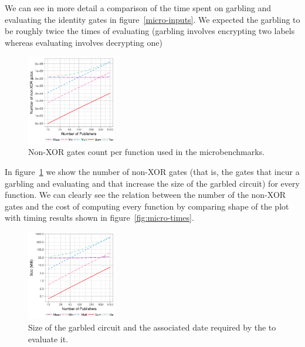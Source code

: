 We can see in more detail a comparison of the time spent on garbling and
evaluating the identity gates in figure~\ref{micro-inputs}.  We expected the
garbling to be roughly twice the times of evaluating (garbling involves
encrypting two labels whereas evaluating involves decrypting one)

\begin{figure}
  \includegraphics[width=0.35\textwidth]{plots/nonxor_gates_log.png}
  \caption{Non-XOR gates count per function used in the microbenchmarks.}
  \label{micro-nonxor}
\end{figure}

In figure~\ref{micro-nonxor} we show the number of non-XOR gates (that is, the
gates that incur a garbling and evaluating and that increase the size of the
garbled circuit) for every function.  We can clearly see the relation between
the number of the non-XOR gates and the cost of computing every function by
comparing shape of the plot with timing results shown in
figure~\ref{fig:micro-times}.

\begin{figure}
  \includegraphics[width=0.35\textwidth]{plots/size_log.png}
  \caption{Size of the garbled circuit and the associated date required by the
    \broker to evaluate it.}
  \label{micro-sizes}
\end{figure}

